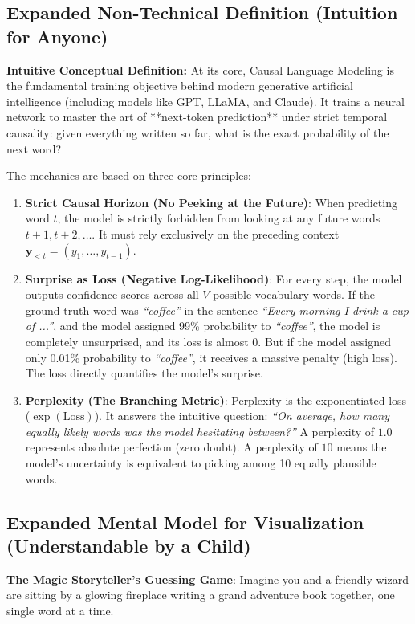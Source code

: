\documentclass[11pt,a4paper]{article}
\theoremstyle{definition}
\begin{document}
\subsection{Expanded Non-Technical Definition (Intuition for Anyone)}
\textbf{Intuitive Conceptual Definition:}
At its core, Causal Language Modeling is the fundamental training objective behind modern generative artificial intelligence (including models like GPT, LLaMA, and Claude). It trains a neural network to master the art of **next-token prediction** under strict temporal causality: given everything written so far, what is the exact probability of the next word?

The mechanics are based on three core principles:
\begin{enumerate}
    \item \textbf{Strict Causal Horizon (No Peeking at the Future)}: When predicting word $t$, the model is strictly forbidden from looking at any future words $t+1, t+2, \dots$. It must rely exclusively on the preceding context $\mathbf{y}_{<t} = (y_1, \dots, y_{t-1})$.
    \item \textbf{Surprise as Loss (Negative Log-Likelihood)}: For every step, the model outputs confidence scores across all $V$ possible vocabulary words. If the ground-truth word was \emph{``coffee''} in the sentence \emph{``Every morning I drink a cup of ...''}, and the model assigned 99\% probability to \emph{``coffee''}, the model is completely unsurprised, and its loss is almost 0. But if the model assigned only 0.01\% probability to \emph{``coffee''}, it receives a massive penalty (high loss). The loss directly quantifies the model's surprise.
    \item \textbf{Perplexity (The Branching Metric)}: Perplexity is the exponentiated loss ($\exp(\text{Loss})$). It answers the intuitive question: \emph{``On average, how many equally likely words was the model hesitating between?''} A perplexity of $1.0$ represents absolute perfection (zero doubt). A perplexity of $10$ means the model's uncertainty is equivalent to picking among 10 equally plausible words.
\end{enumerate}

\subsection{Expanded Mental Model for Visualization (Understandable by a Child)}
\textbf{The Magic Storyteller's Guessing Game}:
Imagine you and a friendly wizard are sitting by a glowing fireplace writing a grand adventure book together, one single word at a time.
\end{document}
